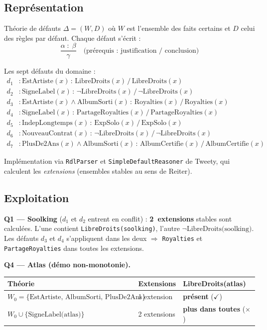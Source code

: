 \documentclass[11pt, a4paper]{article}
\newcommand{\code}[1]{\texttt{#1}}
\begin{document}
\subsection*{Représentation}

Théorie de défauts $\Delta = (W, D)$ où $W$ est l'ensemble des faits certains
et $D$ celui des règles par défaut. Chaque défaut s'écrit :
\[
\frac{\alpha \;:\; \beta}{\gamma}
\quad\text{(prérequis : justification / conclusion)}
\]

\noindent Les sept défauts du domaine :
\begin{align*}
d_1 &: \text{EstArtiste}(x) \,:\, \text{LibreDroits}(x) \,/\, \text{LibreDroits}(x) \\
d_2 &: \text{SigneLabel}(x) \,:\, \lnot\text{LibreDroits}(x) \,/\, \lnot\text{LibreDroits}(x) \\
d_3 &: \text{EstArtiste}(x) \land \text{AlbumSorti}(x) \,:\, \text{Royalties}(x) \,/\, \text{Royalties}(x) \\
d_4 &: \text{SigneLabel}(x) \,:\, \text{PartageRoyalties}(x) \,/\, \text{PartageRoyalties}(x) \\
d_5 &: \text{IndepLongtemps}(x) \,:\, \text{ExpSolo}(x) \,/\, \text{ExpSolo}(x) \\
d_6 &: \text{NouveauContrat}(x) \,:\, \lnot\text{LibreDroits}(x) \,/\, \lnot\text{LibreDroits}(x) \\
d_7 &: \text{PlusDe2Ans}(x) \land \text{AlbumSorti}(x) \,:\, \text{AlbumCertifie}(x) \,/\, \text{AlbumCertifie}(x)
\end{align*}

\noindent Implémentation via \code{RdlParser} et \code{SimpleDefaultReasoner}
de Tweety, qui calculent les \emph{extensions} (ensembles stables au sens de
Reiter).

\subsection*{Exploitation}

\textbf{Q1 --- Soolking} ($d_1$ et $d_2$ entrent en conflit) :
\textbf{2~extensions} stables sont calculées. L'une contient
\code{LibreDroits(soolking)}, l'autre $\lnot\text{LibreDroits(soolking)}$.
Les défauts $d_3$ et $d_4$ s'appliquent dans les deux $\Rightarrow$
\code{Royalties} et \code{PartageRoyalties} dans toutes les extensions.

\textbf{Q4 --- Atlas (démo non-monotonie).}
\begin{center}\small
\begin{tabular}{lll}
\toprule
\textbf{Théorie} & \textbf{Extensions} & \textbf{LibreDroits(atlas)} \\
\midrule
$W_0 = \{\text{EstArtiste, AlbumSorti, PlusDe2Ans}\}$ & 1 extension & \textbf{présent} ($\checkmark$) \\
$W_0 \cup \{\text{SigneLabel(atlas)}\}$               & 2 extensions & \textbf{plus dans toutes} ($\times$) \\
\bottomrule
\end{tabular}
\end{center}
\end{document}
